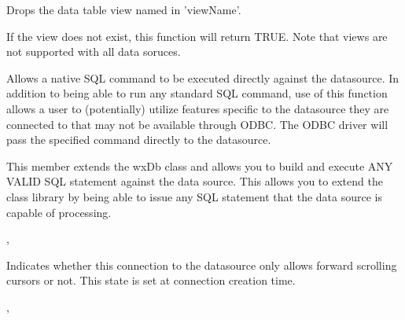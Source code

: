 \label{wxdbdropview}


Drops the data table view named in 'viewName'.




If the view does not exist, this function will return TRUE.  Note that views are not supported with all data soruces.

\label{wxdbexecsql}


Allows a native SQL command to be executed directly against the datasource.  In addition to being able to run any standard SQL command, use of this function allows a user to (potentially) utilize features specific to the datasource they are connected to that may not be available through ODBC.  The ODBC driver will pass the specified command directly to the datasource.




This member extends the wxDb class and allows you to build and execute ANY VALID
SQL statement against the data source.  This allows you to extend the class 
library by being able to issue any SQL statement that the data source is capable
of processing.


, 

\label{wxdbfwdonlycursors}


Indicates whether this connection to the datasource only allows forward scrolling cursors or not.  This state is set at connection creation time.


, 

\label{wxdbgetcatalog}


